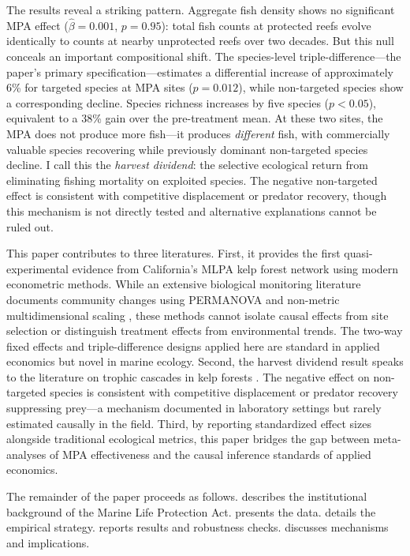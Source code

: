 \documentclass[12pt]{article}
\begin{document}
The results reveal a striking pattern. Aggregate fish density shows no significant MPA effect ($\hat{\beta} = 0.001$, $p = 0.95$): total fish counts at protected reefs evolve identically to counts at nearby unprotected reefs over two decades. But this null conceals an important compositional shift. The species-level triple-difference---the paper's primary specification---estimates a differential increase of approximately 6\% for targeted species at MPA sites ($p = 0.012$), while non-targeted species show a corresponding decline. Species richness increases by five species ($p < 0.05$), equivalent to a 38\% gain over the pre-treatment mean. At these two sites, the MPA does not produce more fish---it produces \textit{different} fish, with commercially valuable species recovering while previously dominant non-targeted species decline. I call this the \textit{harvest dividend}: the selective ecological return from eliminating fishing mortality on exploited species. The negative non-targeted effect is consistent with competitive displacement or predator recovery, though this mechanism is not directly tested and alternative explanations cannot be ruled out.

This paper contributes to three literatures. First, it provides the first quasi-experimental evidence from California's MLPA kelp forest network using modern econometric methods. While an extensive biological monitoring literature documents community changes using PERMANOVA and non-metric multidimensional scaling \citep{caselle2015recovery, hamilton2010incorporating}, these methods cannot isolate causal effects from site selection or distinguish treatment effects from environmental trends. The two-way fixed effects and triple-difference designs applied here are standard in applied economics \citep{angrist2009mostly} but novel in marine ecology. Second, the harvest dividend result speaks to the literature on trophic cascades in kelp forests \citep{estes1974sea, steneck2002kelp}. The negative effect on non-targeted species is consistent with competitive displacement or predator recovery suppressing prey---a mechanism documented in laboratory settings \citep{shears2006babcock} but rarely estimated causally in the field. Third, by reporting standardized effect sizes alongside traditional ecological metrics, this paper bridges the gap between meta-analyses of MPA effectiveness \citep{lester2009biological, sciberras2015meta} and the causal inference standards of applied economics.

The remainder of the paper proceeds as follows.  describes the institutional background of the Marine Life Protection Act.  presents the data.  details the empirical strategy.  reports results and robustness checks.  discusses mechanisms and implications.
\end{document}

